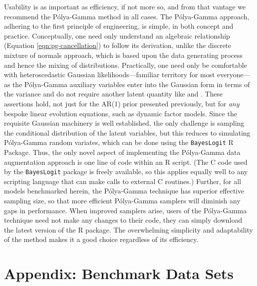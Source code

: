 \documentclass[12pt]{article}
\newcommand{\Polya}{P\'{o}lya}
\begin{document}
Usability is as important as efficiency, if not more so, and from that vantage
we recommend the \Polya-Gamma method in all cases.  The \Polya-Gamma approach,
adhering to the first principle of engineering, is simple, in both concept and
practice.  Conceptually, one need only understand an algebraic relationship
(Equation \ref{eqn:pg-cancellation}) to follow its derivation, unlike the
discrete mixture of normals approach, which is based upon the data generating
process and hence the mixing of distributions.  Practically, one need only be
comfortable with heteroscedastic Gaussian likelihoods---familiar territory for
most everyone---as the \Polya-Gamma auxiliary variables enter into the Gaussian
form in terms of the variance and do not require another latent quantity like
\cite{fruhwirth-schnatter-etal-2009} and \cite{fussl-etal-2013}.  These
assertions hold, not just for the AR(1) prior presented previously, but for
\emph{any} bespoke linear evolution equations, such as dynamic factor models.
Since the requisite Gaussian machinery is well established, the only challenge
is sampling the conditional distribution of the latent variables, but this
reduces to simulating \Polya-Gamma random variates, which can be done using the
\texttt{BayesLogit} R Package.  Thus, the only novel aspect of implementing the
\Polya-Gamma data augmentation approach is one line of code within an R script.
(The C code used by the \texttt{BayesLogit} package is freely available, so this
applies equally well to any scripting language that can make calls to external C
routines.)  Further, for all models benchmarked herein, the \Polya-Gamma
technique has superior effective sampling size, so that more efficient
\Polya-Gamma samplers will diminish any gaps in performance.  When improved
samplers arise, users of the \Polya-Gamma technique need not make any changes to
their code, they can simply download the latest version of the R package.  The
overwhelming simplicity and adaptability of the method makes it a good choice
regardless of its efficiency.

\section*{Appendix: Benchmark Data Sets}
\label{sec:benchmark-details}

\end{document}
